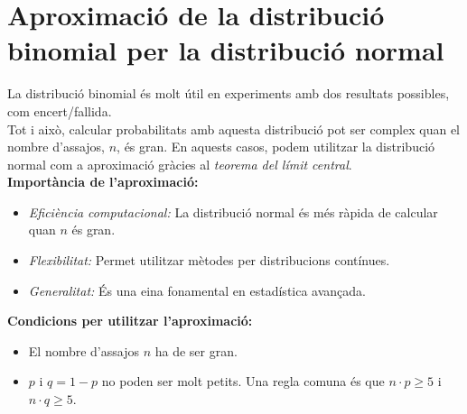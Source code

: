 \documentclass[12pt]{article}
\begin{document}
\newpage

\section{Aproximació de la distribució binomial per la distribució normal}

\begin{concept} \noindent
La distribució binomial és molt útil en experiments amb dos resultats possibles, com encert/fallida. \\

Tot i això, calcular probabilitats amb aquesta distribució pot ser complex quan el nombre d'assajos, $n$, és gran. En aquests casos, podem utilitzar la distribució normal com a aproximació gràcies al \textit{teorema del límit central}.\\

\textbf{Importància de l'aproximació:}
\begin{itemize}
    \item \textit{Eficiència computacional:} La distribució normal és més ràpida de calcular quan $n$ és gran.
    \item \textit{Flexibilitat:} Permet utilitzar mètodes per distribucions contínues.
    \item \textit{Generalitat:} És una eina fonamental en estadística avançada.
\end{itemize}

\textbf{Condicions per utilitzar l'aproximació:}
\begin{itemize}
    \item El nombre d'assajos $n$ ha de ser gran.
    \item $p$ i $q = 1 - p$ no poden ser molt petits. Una regla comuna és que $n \cdot p \geq 5$ i $n \cdot q \geq 5$.
\end{itemize}
\end{concept}
\end{document}
